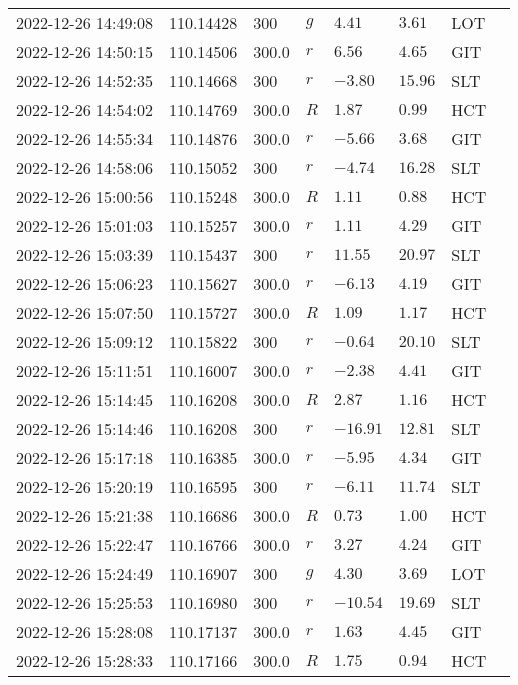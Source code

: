 \documentclass{nature_plusfigure}
\begin{document}
\begin{supplement}
\begin{center}
\begin{longtable}{llllllll}
2022-12-26 14:49:08 & 110.14428 & 300 & $g$ & $4.41$ & $3.61$ & LOT &  \\ 
2022-12-26 14:50:15 & 110.14506 & 300.0 & $r$ & $6.56$ & $4.65$ & GIT &  \\ 
2022-12-26 14:52:35 & 110.14668 & 300 & $r$ & $-3.80$ & $15.96$ & SLT &  \\ 
2022-12-26 14:54:02 & 110.14769 & 300.0 & $R$ & $1.87$ & $0.99$ & HCT &  \\ 
2022-12-26 14:55:34 & 110.14876 & 300.0 & $r$ & $-5.66$ & $3.68$ & GIT &  \\ 
2022-12-26 14:58:06 & 110.15052 & 300 & $r$ & $-4.74$ & $16.28$ & SLT &  \\ 
2022-12-26 15:00:56 & 110.15248 & 300.0 & $R$ & $1.11$ & $0.88$ & HCT &  \\ 
2022-12-26 15:01:03 & 110.15257 & 300.0 & $r$ & $1.11$ & $4.29$ & GIT &  \\ 
2022-12-26 15:03:39 & 110.15437 & 300 & $r$ & $11.55$ & $20.97$ & SLT &  \\ 
2022-12-26 15:06:23 & 110.15627 & 300.0 & $r$ & $-6.13$ & $4.19$ & GIT &  \\ 
2022-12-26 15:07:50 & 110.15727 & 300.0 & $R$ & $1.09$ & $1.17$ & HCT &  \\ 
2022-12-26 15:09:12 & 110.15822 & 300 & $r$ & $-0.64$ & $20.10$ & SLT &  \\ 
2022-12-26 15:11:51 & 110.16007 & 300.0 & $r$ & $-2.38$ & $4.41$ & GIT &  \\ 
2022-12-26 15:14:45 & 110.16208 & 300.0 & $R$ & $2.87$ & $1.16$ & HCT &  \\ 
2022-12-26 15:14:46 & 110.16208 & 300 & $r$ & $-16.91$ & $12.81$ & SLT &  \\ 
2022-12-26 15:17:18 & 110.16385 & 300.0 & $r$ & $-5.95$ & $4.34$ & GIT &  \\ 
2022-12-26 15:20:19 & 110.16595 & 300 & $r$ & $-6.11$ & $11.74$ & SLT &  \\ 
2022-12-26 15:21:38 & 110.16686 & 300.0 & $R$ & $0.73$ & $1.00$ & HCT &  \\ 
2022-12-26 15:22:47 & 110.16766 & 300.0 & $r$ & $3.27$ & $4.24$ & GIT &  \\ 
2022-12-26 15:24:49 & 110.16907 & 300 & $g$ & $4.30$ & $3.69$ & LOT &  \\ 
2022-12-26 15:25:53 & 110.16980 & 300 & $r$ & $-10.54$ & $19.69$ & SLT &  \\ 
2022-12-26 15:28:08 & 110.17137 & 300.0 & $r$ & $1.63$ & $4.45$ & GIT &  \\ 
2022-12-26 15:28:33 & 110.17166 & 300.0 & $R$ & $1.75$ & $0.94$ & HCT &  \\ 

\end{longtable}
\end{center}
\end{supplement}
\end{document}
